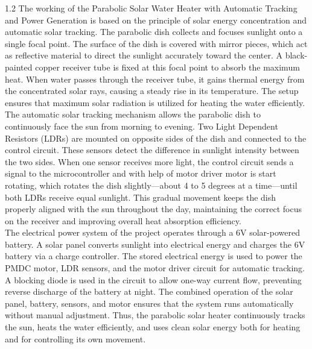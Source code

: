 \documentclass[12pt,a4paper]{article}
\begin{document}
\noindent
\begin{spacing}{1.2}
{\fontsize{10}{14}\selectfont
The working of the Parabolic Solar Water Heater with Automatic Tracking and Power Generation is based on the principle of solar energy concentration and automatic solar tracking. The parabolic dish collects and focuses sunlight onto a single focal point. The surface of the dish is covered with mirror pieces, which act as reflective material to direct the sunlight accurately toward the center. A black-painted copper receiver tube is fixed at this focal point to absorb the maximum heat. When water passes through the receiver tube, it gains thermal energy from the concentrated solar rays, causing a steady rise in its temperature. The setup ensures that maximum solar radiation is utilized for heating the water efficiently.\\[3.5mm]
The automatic solar tracking mechanism allows the parabolic dish to continuously face the sun from morning to evening. Two Light Dependent Resistors (LDRs) are mounted on opposite sides of the dish and connected to the control circuit. These sensors detect the difference in sunlight intensity between the two sides. When one sensor receives more light, the control circuit sends a signal to the microcontroller and with help of motor driver motor is start rotating, which rotates the dish slightly---about 4 to 5 degrees at a time---until both LDRs receive equal sunlight. This gradual movement keeps the dish properly aligned with the sun throughout the day, maintaining the correct focus on the receiver and improving overall heat absorption efficiency.\\[3.5mm]
The electrical power system of the project operates through a 6V solar-powered battery. A solar panel converts sunlight into electrical energy and charges the 6V battery via a charge controller. The stored electrical energy is used to power the PMDC motor, LDR sensors, and the motor driver circuit for automatic tracking. A blocking diode is used in the circuit to allow one-way current flow, preventing reverse discharge of the battery at night. The combined operation of the solar panel, battery, sensors, and motor ensures that the system runs automatically without manual adjustment. Thus, the parabolic solar heater continuously tracks the sun, heats the water efficiently, and uses clean solar energy both for heating and for controlling its own movement.
}
\end{spacing}
\clearpage

\end{document}
